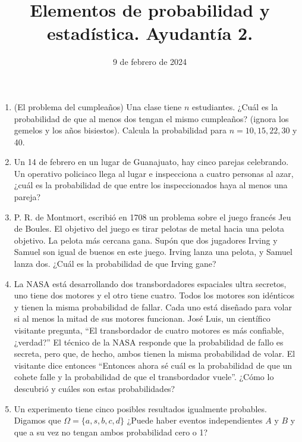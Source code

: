 \documentclass{article}
\title{Elementos de probabilidad y estadística. Ayudantía 2.}
\date{9 de febrero de 2024}
\begin{document}
\maketitle


\begin{enumerate}
    \item (El problema del cumpleaños) Una clase tiene $n$ estudiantes. ¿Cuál es la
    probabilidad de que al menos dos tengan el mismo cumpleaños? (ignora los gemelos
    y los años bisiestos). Calcula la probabilidad para $n=10,15,22,30$ y 40.

    \item Un 14 de febrero en un lugar de Guanajuato, hay cinco parejas celebrando.
    Un operativo policiaco llega al lugar e inspecciona a cuatro personas al azar,
    ¿cuál es la probabilidad de que entre los inspeccionados haya al menos una pareja?

    \item P. R. de Montmort, escribió en 1708 un problema sobre el juego francés
    Jeu de Boules.  El objetivo del juego es  tirar pelotas de metal hacia una pelota 
    objetivo.  La pelota más cercana gana.  Supón que dos jugadores Irving y Samuel son igual
    de buenos en este juego. Irving lanza una pelota, y Samuel lanza dos. ¿Cuál es la
    probabilidad de que Irving gane?

    \item La NASA está desarrollando dos transbordadores espaciales ultra secretos,
    uno tiene dos motores y el otro tiene cuatro.  Todos los motores son idénticos 
    y tienen la misma probabilidad de fallar.  Cada uno está diseñado para volar si 
    al menos la mitad de sus motores funcionan.  José Luis, un científico visitante pregunta,
    ``El transbordador de cuatro motores es más confiable, ¿verdad?'' El técnico de
    la NASA responde que la probabilidad de fallo es secreta, pero que, de hecho, 
    ambos tienen la misma probabilidad de volar. El visitante dice entonces ``Entonces
    ahora sé cuál es la probabilidad de que un cohete falle y la probabilidad de que
    el transbordador vuele''. ¿Cómo lo descubrió y cuáles son estas probabilidades?
    

    \item Un experimento tiene cinco posibles resultados igualmente probables. Digamos que $\Omega=\{a,s,b,c,d\}$
    ¿Puede haber eventos independientes $A$ y $B$ y que a su vez no tengan ambos probabilidad cero o 1?
    

\end{enumerate}
\end{document}
